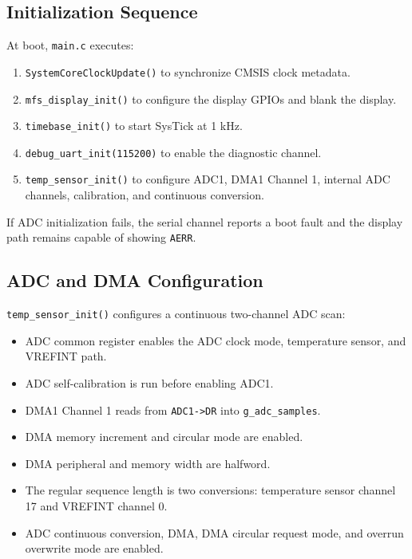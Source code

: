 \documentclass[11pt,a4paper]{article}
\begin{document}
\subsection{Initialization Sequence}

At boot, \texttt{main.c} executes:

\begin{enumerate}[leftmargin=*]
  \item \texttt{SystemCoreClockUpdate()} to synchronize CMSIS clock metadata.
  \item \texttt{mfs\_display\_init()} to configure the display GPIOs and blank the display.
  \item \texttt{timebase\_init()} to start SysTick at 1 kHz.
  \item \texttt{debug\_uart\_init(115200)} to enable the diagnostic channel.
  \item \texttt{temp\_sensor\_init()} to configure ADC1, DMA1 Channel 1, internal ADC channels, calibration, and continuous conversion.
\end{enumerate}

If ADC initialization fails, the serial channel reports a boot fault and the
display path remains capable of showing \texttt{AERR}.

\subsection{ADC and DMA Configuration}

\texttt{temp\_sensor\_init()} configures a continuous two-channel ADC scan:

\begin{itemize}[leftmargin=*]
  \item ADC common register enables the ADC clock mode, temperature sensor, and
        VREFINT path.
  \item ADC self-calibration is run before enabling ADC1.
  \item DMA1 Channel 1 reads from \texttt{ADC1->DR} into
        \texttt{g\_adc\_samples}.
  \item DMA memory increment and circular mode are enabled.
  \item DMA peripheral and memory width are halfword.
  \item The regular sequence length is two conversions:
        temperature sensor channel 17 and VREFINT channel 0.
  \item ADC continuous conversion, DMA, DMA circular request mode, and overrun
        overwrite mode are enabled.
\end{itemize}
\end{document}
